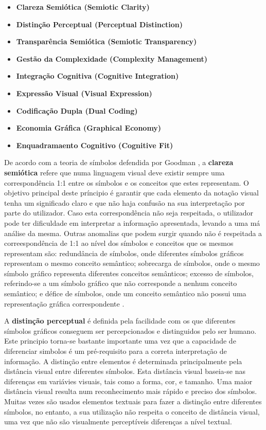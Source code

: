 \begin{itemize}
  \item \textbf{Clareza Semiótica (Semiotic Clarity)}
  \item \textbf{Distinção Perceptual (Perceptual Distinction)}
  \item \textbf{Transparência Semiótica (Semiotic Transparency)}
  \item \textbf{Gestão da Complexidade (Complexity Management)}
  \item \textbf{Integração Cognitiva (Cognitive Integration)}
  \item \textbf{Expressão Visual (Visual Expression)}
  \item \textbf{Codificação Dupla (Dual Coding)}
  \item \textbf{Economia Gráfica (Graphical Economy)}
  \item \textbf{Enquadramaento Cognitivo (Cognitive Fit)}
\end{itemize}

De acordo com a teoria de símbolos defendida por Goodman \cite{goodman1976languages}, a \textbf{clareza semiótica} refere que numa linguagem visual deve existir sempre uma correspondência 1:1 entre os símbolos e os conceitos que estes representam. O objetivo principal deste príncipio é garantir que cada elemento da notação visual tenha um significado claro e que não haja confusão na sua interpretação por parte do utilizador. Caso esta correspondência não seja respeitada, o utilizador pode ter dificuldade em interpretar a informação apresentada, levando a uma má análise da mesma. Outras anomalias que podem surgir quando não é respeitada a correespondência de 1:1 ao nível dos símbolos e conceitos que os mesmos representam são: redundância de símbolos, onde diferentes símbolos gráficos representam o mesmo conceito semântico; sobrecarga de símbolos, onde o mesmo símbolo gráfico representa diferentes conceitos semânticos; excesso de símbolos, referindo-se a um símbolo gráfico que não corresponde a nenhum conceito semântico; e défice de símbolos, onde um conceito semântico não possui uma representação gráfica correspondente \cite{moody2009physics}.

A \textbf{distinção perceptual} é definida pela facilidade com os que diferentes símbolos gráficos conseguem ser percepcionados e distinguidos pelo ser humano. Este principio torna-se bastante importante uma vez que a capacidade de diferenciar simbolos é um pré-requisito para a correta interpretação de informação. A distinção entre elementos é determinada principalmente pela distância visual entre diferentes símbolos. Esta distância visual baseia-se nas diferenças em variávies visuais, tais como a forma, cor, e tamanho. Uma maior distância visual resulta num reconhecimento mais rápido e preciso dos símbolos. Muitas vezes são usados elementos textuais para fazer a distinção entre diferentes símbolos, no entanto, a sua utilização não respeita o conceito de distância visual, uma vez que não são visualmente perceptíveis diferenças a nível textual.

